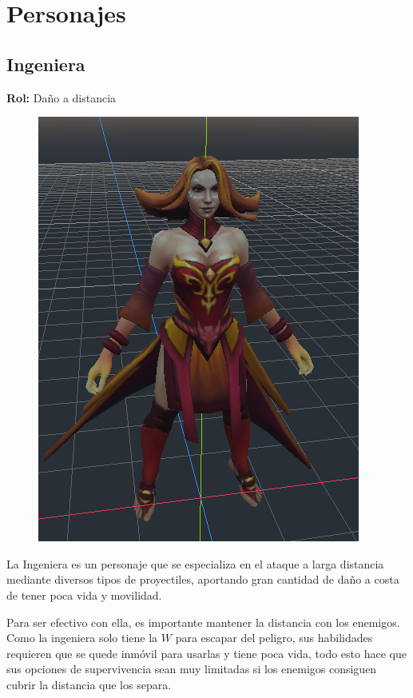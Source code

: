 \newpage
\section{Personajes}


\subsection{Ingeniera}

\textbf{Rol:} Daño a distancia

\begin{figure}[H]
	\centering
	\includegraphics[width=0.4\linewidth]{figures/EngineerModel.png}
	\label{fig:EngineerModel}
\end{figure}


La Ingeniera es un personaje que se especializa en el ataque a larga distancia mediante diversos tipos de proyectiles, aportando gran cantidad de daño a costa de tener poca vida y movilidad.

Para ser efectivo con ella, es importante mantener la distancia con los enemigos. Como la ingeniera solo tiene la $W$ para escapar del peligro, sus habilidades requieren que se quede inmóvil para usarlas y tiene poca vida, todo esto hace que sus opciones de supervivencia sean muy limitadas si los enemigos consiguen cubrir la distancia que los separa. 


